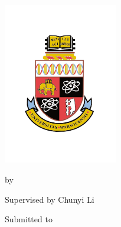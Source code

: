 \begin{titlepage}
\begin{center}
\includegraphics[width=5cm]{Warwick_Crest} 

\vspace*{10pt}
\begin{spacing}{2}
\begin{center}
{\Large \bf \TheTitle} %

\vspace*{-8pt}

by

{\Large \bf \TheAuthor} %

\vspace{-6}
Supervised by Chunyi Li

\vspace*{8pt}

{\large \bf \TheModule} %


Submitted to \TheUni %

\vspace*{16pt}
{\Large \bf \TheDept} %

\TheSubDate %


\end{center}
\end{spacing}
\end{center}
\end{titlepage}
